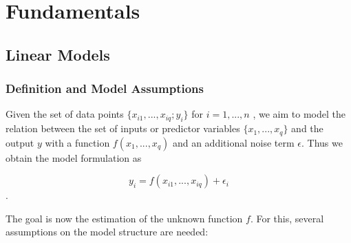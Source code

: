 
\newcommand{\subsubsubsection}[1]{\paragraph{#1}\mbox{}\\}
\setcounter{secnumdepth}{4}
\setcounter{tocdepth}{4}


\chapter{Fundamentals} \label{ChapterLinModel}
	
\section{Linear Models}
\subsection{Definition and Model Assumptions}  \label{SectionLinModelDefAndAssump}

Given the set of data points $\{x_{i1}, ..., x_{iq}; y_i \}$ for $i = 1, ..., n$ , we aim to model the relation between the set of inputs or predictor variables $\{x_1, ..., x_q\}$ and the output $y$ with a function $f(x_1, ..., x_q)$ and an additional noise term $\epsilon$. Thus we obtain the model formulation as

\begin{equation}
	y_i = f(x_{i1}, ..., x_{iq}) + \epsilon_i
\end{equation}.

The goal is now the estimation of the unknown function $f$. For this, several assumptions on the model structure are needed:


